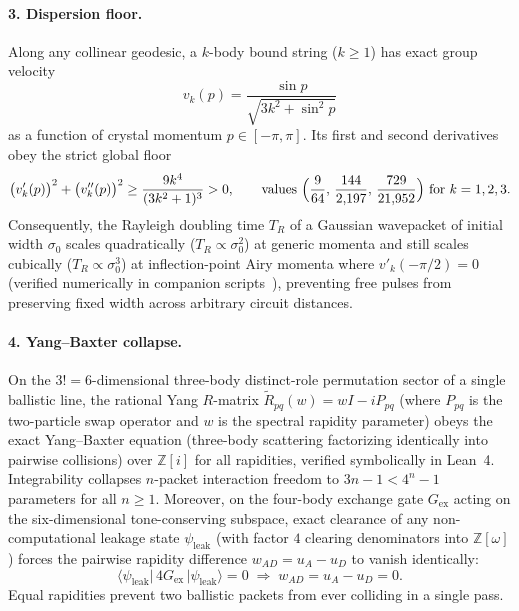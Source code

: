 \paragraph{3. Dispersion floor.}
Along any collinear geodesic, a $k$-body bound string ($k \ge 1$) has exact group velocity
\begin{equation}
\label{eq:group-vel}
v_k(p) = \frac{\sin p}{\sqrt{3 k^2 + \sin^2 p}}
\end{equation}
as a function of crystal momentum $p \in [-\pi,\pi]$. Its first and second derivatives obey the strict global floor
\begin{equation}
\label{eq:disp-floor}
\bigl(v'_k(p)\bigr)^2 + \bigl(v''_k(p)\bigr)^2 \ge \frac{9 k^4}{(3 k^2 + 1)^3} > 0, \qquad
\text{values } \Bigl(\frac{9}{64},\, \frac{144}{2{,}197},\, \frac{729}{21{,}952}\Bigr) \text{ for } k = 1, 2, 3.
\end{equation}
Consequently, the Rayleigh doubling time $T_R$ of a Gaussian wavepacket of initial width $\sigma_0$ scales quadratically ($T_R \propto \sigma_0^2$) at generic momenta and still scales cubically ($T_R \propto \sigma_0^3$) at inflection-point Airy momenta where $v'_k(-\pi/2) = 0$ (verified numerically in companion scripts~\cite{pollard2026repo}), preventing free pulses from preserving fixed width across arbitrary circuit distances.

\paragraph{4. Yang--Baxter collapse.}
On the $3! = 6$-dimensional three-body distinct-role permutation sector of a single ballistic line, the rational Yang $R$-matrix $\tilde{R}_{pq}(w) = w I - i P_{pq}$ (where $P_{pq}$ is the two-particle swap operator and $w$ is the spectral rapidity parameter) obeys the exact Yang--Baxter equation (three-body scattering factorizing identically into pairwise collisions) over $\mathbb{Z}[i]$ for all rapidities, verified symbolically in Lean~4. Integrability collapses $n$-packet interaction freedom to $3n - 1 < 4^n - 1$ parameters for all $n \ge 1$. Moreover, on the four-body exchange gate $G_{\mathrm{ex}}$ acting on the six-dimensional tone-conserving subspace, exact clearance of any non-computational leakage state $\psi_{\mathrm{leak}}$ (with factor $4$ clearing denominators into $\mathbb{Z}[\omega]$) forces the pairwise rapidity difference $w_{AD} = u_A - u_D$ to vanish identically:
\begin{equation}
\label{eq:gex-leak}
\langle \psi_{\mathrm{leak}} |\, 4 G_{\mathrm{ex}} \,| \psi_{\mathrm{leak}} \rangle = 0 \;\Longrightarrow\; w_{AD} = u_A - u_D = 0.
\end{equation}
Equal rapidities prevent two ballistic packets from ever colliding in a single pass.

